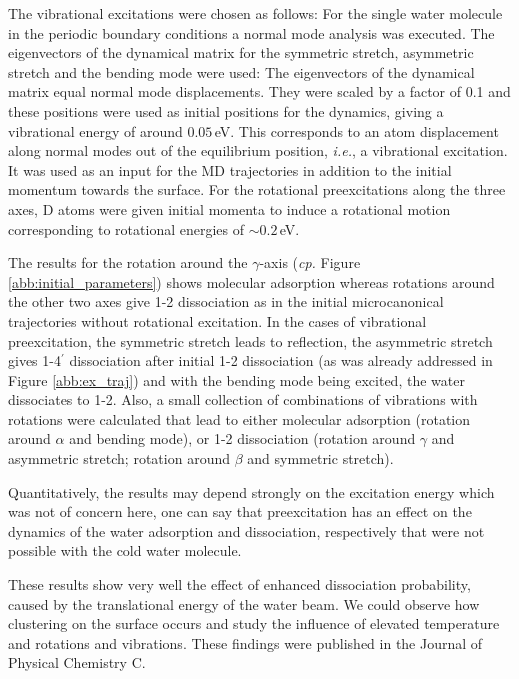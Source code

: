 \documentclass[11pt,DIV=13,BCOR=5mm,a4paper,headinclude]{scrbook}
\newcommand\todo[1]{\textcolor{red}{TODO: \textit{{#1}}}}
\begin{document}
The vibrational excitations were chosen as follows: For the single water molecule in the periodic boundary conditions a normal mode analysis was executed.
The eigenvectors of the dynamical matrix for the symmetric stretch, asymmetric stretch and the bending mode were used: The eigenvectors of the dynamical matrix equal normal mode displacements.
They were scaled by a factor of 0.1 and these positions were used as initial positions for the dynamics, giving a vibrational energy of around $0.05\,$eV. %
This corresponds to an atom displacement along normal modes out of the equilibrium position, \textit{i.e.}, a vibrational excitation.
It was used as an input for the MD trajectories in addition to the initial momentum towards the surface.
For the rotational preexcitations along the three axes, D atoms were given initial momenta to induce a rotational motion corresponding to rotational energies of $\sim 0.2\,$eV.


The results for the rotation around the $\gamma$-axis (\textit{cp.} Figure \ref{abb:initial_parameters}) shows molecular adsorption whereas rotations around the other two axes give 1-2 dissociation as in the initial microcanonical trajectories without rotational excitation.
In the cases of vibrational preexcitation, the symmetric stretch leads to reflection, the asymmetric stretch gives 1-4$^\prime$ dissociation after initial 1-2 dissociation (as was already addressed in Figure \ref{abb:ex_traj}) and with the bending mode being excited, the water dissociates to 1-2.
Also, a small collection of combinations of vibrations with rotations were calculated that lead to either molecular adsorption (rotation around $\alpha$ and bending mode), or 1-2 dissociation (rotation around $\gamma$ and asymmetric stretch; rotation around $\beta$ and symmetric stretch).


Quantitatively, the results may depend strongly on the excitation energy which was not of concern here, one can say that preexcitation has an effect on the dynamics of the water adsorption and dissociation, respectively that were not possible with the cold water molecule.


These results show very well the effect of enhanced dissociation probability, caused by the translational energy of the water beam.
We could observe how clustering on the surface occurs and study the influence of elevated temperature and rotations and vibrations.
These findings were published in the Journal of Physical Chemistry C\cite{Heiden0001_2018}.
\end{document}
